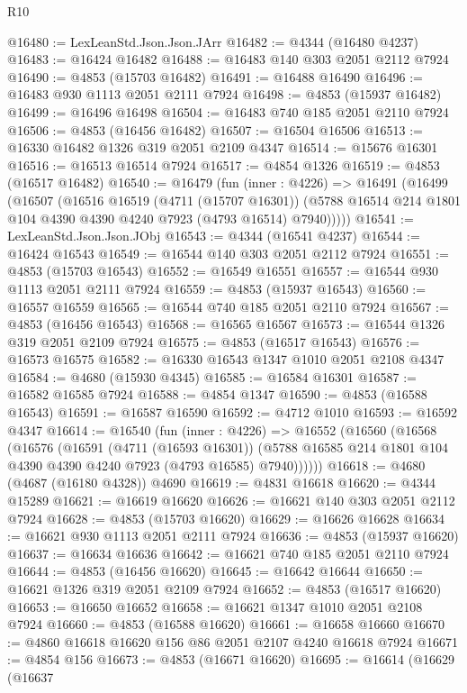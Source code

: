 \begin{lexlean}{R10}
\begin{coremodule}
@16480 := LexLeanStd.Json.Json.JArr
@16482 := @4344 (@16480 @4237)
@16483 := @16424 @16482
@16488 := @16483 @140 @303 @2051 @2112 @7924
@16490 := @4853 (@15703 @16482)
@16491 := @16488 @16490
@16496 := @16483 @930 @1113 @2051 @2111 @7924
@16498 := @4853 (@15937 @16482)
@16499 := @16496 @16498
@16504 := @16483 @740 @185 @2051 @2110 @7924
@16506 := @4853 (@16456 @16482)
@16507 := @16504 @16506
@16513 := @16330 @16482 @1326 @319 @2051 @2109 @4347
@16514 := @15676 @16301
@16516 := @16513 @16514 @7924
@16517 := @4854 @1326
@16519 := @4853 (@16517 @16482)
@16540 := @16479
    (fun (inner : @4226) =>
    @16491
      (@16499
        (@16507
          (@16516
            @16519
            (@4711 (@15707 @16301))
            (@5788 @16514 @214 @1801 @104 @4390 @4390 @4240 @7923 (@4793 @16514) @7940)))))
@16541 := LexLeanStd.Json.Json.JObj
@16543 := @4344 (@16541 @4237)
@16544 := @16424 @16543
@16549 := @16544 @140 @303 @2051 @2112 @7924
@16551 := @4853 (@15703 @16543)
@16552 := @16549 @16551
@16557 := @16544 @930 @1113 @2051 @2111 @7924
@16559 := @4853 (@15937 @16543)
@16560 := @16557 @16559
@16565 := @16544 @740 @185 @2051 @2110 @7924
@16567 := @4853 (@16456 @16543)
@16568 := @16565 @16567
@16573 := @16544 @1326 @319 @2051 @2109 @7924
@16575 := @4853 (@16517 @16543)
@16576 := @16573 @16575
@16582 := @16330 @16543 @1347 @1010 @2051 @2108 @4347
@16584 := @4680 (@15930 @4345)
@16585 := @16584 @16301
@16587 := @16582 @16585 @7924
@16588 := @4854 @1347
@16590 := @4853 (@16588 @16543)
@16591 := @16587 @16590
@16592 := @4712 @1010
@16593 := @16592 @4347
@16614 := @16540
    (fun (inner : @4226) =>
    @16552
      (@16560
        (@16568
          (@16576
            (@16591
              (@4711 (@16593 @16301))
              (@5788 @16585 @214 @1801 @104 @4390 @4390 @4240 @7923 (@4793 @16585) @7940))))))
@16618 := @4680 (@4687 (@16180 @4328)) @4690
@16619 := @4831 @16618
@16620 := @4344 @15289
@16621 := @16619 @16620
@16626 := @16621 @140 @303 @2051 @2112 @7924
@16628 := @4853 (@15703 @16620)
@16629 := @16626 @16628
@16634 := @16621 @930 @1113 @2051 @2111 @7924
@16636 := @4853 (@15937 @16620)
@16637 := @16634 @16636
@16642 := @16621 @740 @185 @2051 @2110 @7924
@16644 := @4853 (@16456 @16620)
@16645 := @16642 @16644
@16650 := @16621 @1326 @319 @2051 @2109 @7924
@16652 := @4853 (@16517 @16620)
@16653 := @16650 @16652
@16658 := @16621 @1347 @1010 @2051 @2108 @7924
@16660 := @4853 (@16588 @16620)
@16661 := @16658 @16660
@16670 := @4860 @16618 @16620 @156 @86 @2051 @2107 @4240 @16618 @7924
@16671 := @4854 @156
@16673 := @4853 (@16671 @16620)
@16695 := @16614
    (@16629
      (@16637

\end{coremodule}
\end{lexlean}
